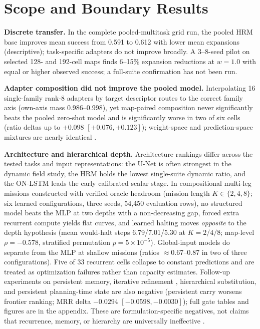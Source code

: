 \documentclass[letterpaper]{article} %
\begin{document}
\section{Scope and Boundary Results}

\textbf{Discrete transfer.} In the complete pooled-multitask grid run, the pooled HRM base improves mean success from 0.591 to 0.612 with lower mean expansions (descriptive); task-specific adapters do not improve broadly. A 3--8-seed pilot on selected 128- and 192-cell maps finds 6--15\% expansion reductions at $w{=}1.0$ with equal or higher observed success; a full-suite confirmation has not been run.

\textbf{Adapter composition did not improve the pooled model.} Interpolating 16 single-family rank-8 adapters by target descriptor routes to the correct family axis (own-axis mass 0.986--0.998), yet map-paired composition never significantly beats the pooled zero-shot model and is significantly worse in two of six cells (ratio deltas up to $+0.098$ $[+0.076,+0.123]$); weight-space and prediction-space mixtures are nearly identical \citep{wortsman2022soups,ilharco2022task}.

\textbf{Architecture and hierarchical depth.} Architecture rankings differ across the tested tasks and input representations: the U-Net is often strongest in the dynamic field study, the HRM holds the lowest single-suite dynamic ratio, and the ON-LSTM leads the early calibrated scalar stage. In compositional multi-leg missions constructed with verified oracle headroom (mission length $K \in \{2,4,8\}$; six learned configurations, three seeds, 54{,}450 evaluation rows), no structured model beats the MLP at two depths with a non-decreasing gap, forced extra recurrent compute yields flat curves, and learned halting moves \emph{opposite} to the depth hypothesis (mean would-halt steps 6.79/7.01/5.30 at $K{=}2/4/8$; map-level $\rho=-0.578$, stratified permutation $p=5\times10^{-5}$). Global-input models do separate from the MLP at shallow missions (ratios ${\approx}$0.67--0.87 in two of three configurations). Five of 33 recurrent cells collapse to constant predictions and are treated as optimization failures rather than capacity estimates. Follow-up experiments on persistent memory, iterative refinement \citep{tamar2016vin,lee2018gppn}, hierarchical substitution, and persistent planning-time state are also negative (persistent carry worsens frontier ranking; MRR delta $-0.0294$ $[-0.0598,-0.0030]$); full gate tables and figures are in the appendix. These are formulation-specific negatives, not claims that recurrence, memory, or hierarchy are universally ineffective \citep{jolicoeur2025trm,czechowski2021subgoal}.
\end{document}
